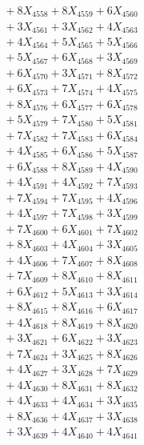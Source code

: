 \documentclass[a4paper,10pt]{article}
\begin{document}
{\begin{align}
&\;  + 8 X_{4558} + 8 X_{4559} + 6 X_{4560} \\[0.3ex]
&\;  + 3 X_{4561} + 3 X_{4562} + 4 X_{4563} \\[0.3ex]
&\;  + 4 X_{4564} + 5 X_{4565} + 5 X_{4566} \\[0.3ex]
&\;  + 5 X_{4567} + 6 X_{4568} + 3 X_{4569} \\[0.5ex]\allowbreak
&\;  + 6 X_{4570} + 3 X_{4571} + 8 X_{4572} \\[0.3ex]
&\;  + 6 X_{4573} + 7 X_{4574} + 4 X_{4575} \\[0.3ex]
&\;  + 8 X_{4576} + 6 X_{4577} + 6 X_{4578} \\[0.3ex]
&\;  + 5 X_{4579} + 7 X_{4580} + 5 X_{4581} \\[0.3ex]
&\;  + 7 X_{4582} + 7 X_{4583} + 6 X_{4584} \\[0.3ex]
&\;  + 4 X_{4585} + 6 X_{4586} + 5 X_{4587} \\[0.3ex]
&\;  + 6 X_{4588} + 8 X_{4589} + 4 X_{4590} \\[0.3ex]
&\;  + 4 X_{4591} + 4 X_{4592} + 7 X_{4593} \\[0.3ex]
&\;  + 7 X_{4594} + 7 X_{4595} + 4 X_{4596} \\[0.3ex]
&\;  + 4 X_{4597} + 7 X_{4598} + 3 X_{4599} \\[0.5ex]\allowbreak
&\;  + 7 X_{4600} + 6 X_{4601} + 7 X_{4602} \\[0.3ex]
&\;  + 8 X_{4603} + 4 X_{4604} + 3 X_{4605} \\[0.3ex]
&\;  + 4 X_{4606} + 7 X_{4607} + 8 X_{4608} \\[0.3ex]
&\;  + 7 X_{4609} + 8 X_{4610} + 8 X_{4611} \\[0.3ex]
&\;  + 6 X_{4612} + 5 X_{4613} + 3 X_{4614} \\[0.3ex]
&\;  + 8 X_{4615} + 8 X_{4616} + 6 X_{4617} \\[0.3ex]
&\;  + 4 X_{4618} + 8 X_{4619} + 8 X_{4620} \\[0.3ex]
&\;  + 3 X_{4621} + 6 X_{4622} + 3 X_{4623} \\[0.3ex]
&\;  + 7 X_{4624} + 3 X_{4625} + 8 X_{4626} \\[0.3ex]
&\;  + 4 X_{4627} + 3 X_{4628} + 7 X_{4629} \\[0.5ex]\allowbreak
&\;  + 4 X_{4630} + 8 X_{4631} + 8 X_{4632} \\[0.3ex]
&\;  + 4 X_{4633} + 4 X_{4634} + 3 X_{4635} \\[0.3ex]
&\;  + 8 X_{4636} + 4 X_{4637} + 3 X_{4638} \\[0.3ex]
&\;  + 3 X_{4639} + 4 X_{4640} + 4 X_{4641} \\[0.3ex]

\end{align}}
\end{document}
